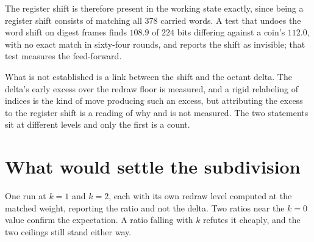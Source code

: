The register shift is therefore present in the working state exactly, since being a register shift consists of matching all \(378\) carried words. A test that undoes the word shift on digest frames finds \(108.9\) of \(224\) bits differing against a coin's \(112.0\), with no exact match in sixty-four rounds, and reports the shift as invisible; that test measures the feed-forward.

What is not established is a link between the shift and the octant delta. The delta's early excess over the redraw floor is measured, and a rigid relabeling of indices is the kind of move producing such an excess, but attributing the excess to the register shift is a reading of why and is not measured. The two statements sit at different levels and only the first is a count.

\section{What would settle the subdivision}

One run at \(k = 1\) and \(k = 2\), each with its own redraw level computed at the matched weight, reporting the ratio and not the delta. Two ratios near the \(k = 0\) value confirm the expectation. A ratio falling with \(k\) refutes it cheaply, and the two ceilings still stand either way.
